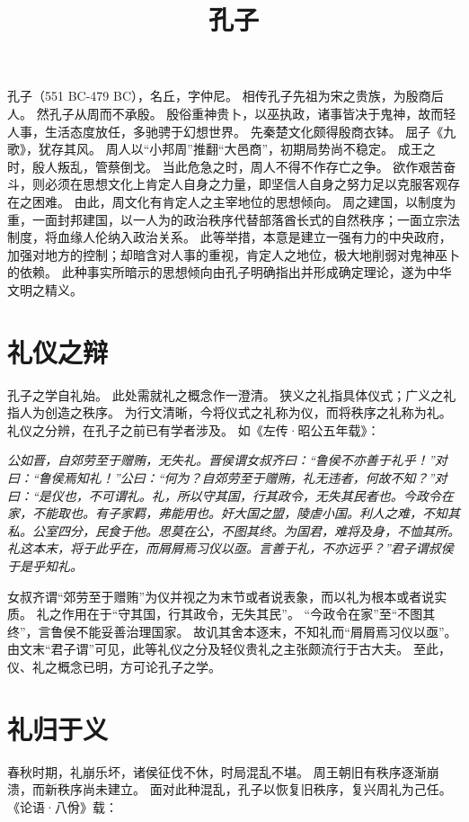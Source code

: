 \documentclass[11pt]{article}
\title{孔子}
\date{}
\begin{document}
  \maketitle
  
  \linenumbers


孔子（551 BC-479 BC），名丘，字仲尼。
相传孔子先祖为宋之贵族，为殷商后人。
然孔子从周而不承殷。
殷俗重神贵卜，以巫执政，诸事皆决于鬼神，故而轻人事，生活态度放任，多驰骋于幻想世界。
先秦楚文化颇得殷商衣钵。
屈子《九歌》，犹存其风。
周人以“小邦周”推翻“大邑商”，初期局势尚不稳定。
成王之时，殷人叛乱，管蔡倒戈。
当此危急之时，周人不得不作存亡之争。
欲作艰苦奋斗，则必须在思想文化上肯定人自身之力量，即坚信人自身之努力足以克服客观存在之困难。
由此，周文化有肯定人之主宰地位的思想倾向。
周之建国，以制度为重，一面封邦建国，以一人为的政治秩序代替部落酋长式的自然秩序；一面立宗法制度，将血缘人伦纳入政治关系。
此等举措，本意是建立一强有力的中央政府，加强对地方的控制；却暗含对人事的重视，肯定人之地位，极大地削弱对鬼神巫卜的依赖。
此种事实所暗示的思想倾向由孔子明确指出并形成确定理论，遂为中华文明之精义。

\section{礼仪之辩}
孔子之学自礼始。
此处需就礼之概念作一澄清。
狭义之礼指具体仪式；广义之礼指人为创造之秩序。
为行文清晰，今将仪式之礼称为仪，而将秩序之礼称为礼。
礼仪之分辨，在孔子之前已有学者涉及。
如《左传·昭公五年载》：

\textit{公如晋，自郊劳至于赠贿，无失礼。晋侯谓女叔齐曰：“鲁侯不亦善于礼乎！”对曰：“鲁侯焉知礼！”公曰：“何为？自郊劳至于赠贿，礼无违者，何故不知？”对曰：“是仪也，不可谓礼。礼，所以守其国，行其政令，无失其民者也。今政令在家，不能取也。有子家羁，弗能用也。奸大国之盟，陵虐小国。利人之难，不知其私。公室四分，民食于他。思莫在公，不图其终。为国君，难将及身，不恤其所。礼这本末，将于此乎在，而屑屑焉习仪以亟。言善于礼，不亦远乎？”君子谓叔侯于是乎知礼。}

女叔齐谓“郊劳至于赠贿”为仪并视之为末节或者说表象，而以礼为根本或者说实质。
礼之作用在于“守其国，行其政令，无失其民”。
“今政令在家”至“不图其终”，言鲁侯不能妥善治理国家。
故讥其舍本逐末，不知礼而“屑屑焉习仪以亟”。
由文末“君子谓”可见，此等礼仪之分及轻仪贵礼之主张颇流行于古大夫。
至此，仪、礼之概念已明，方可论孔子之学。

\section{礼归于义}
春秋时期，礼崩乐坏，诸侯征伐不休，时局混乱不堪。
周王朝旧有秩序逐渐崩溃，而新秩序尚未建立。
面对此种混乱，孔子以恢复旧秩序，复兴周礼为己任。
《论语·八佾》载：
\end{document}
